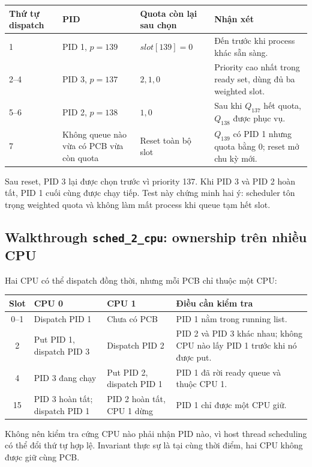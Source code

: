\documentclass[12pt,a4paper]{article}
\begin{document}
\begin{small}
\begin{longtable}{|p{2.3cm}|p{3cm}|p{3.3cm}|p{5.1cm}|}
\hline
\textbf{Thứ tự dispatch} & \textbf{PID} & \textbf{Quota còn lại sau chọn} &
\textbf{Nhận xét}\\ \hline
1 & PID 1, \(p=139\) & \(slot[139]=0\) & Đến trước khi process khác sẵn
sàng.\\ \hline
2--4 & PID 3, \(p=137\) & \(2,1,0\) & Priority cao nhất trong ready set,
dùng đủ ba weighted slot.\\ \hline
5--6 & PID 2, \(p=138\) & \(1,0\) & Sau khi \(Q_{137}\) hết quota,
\(Q_{138}\) được phục vụ.\\ \hline
7 & Không queue nào vừa có PCB vừa còn quota & Reset toàn bộ slot &
\(Q_{139}\) có PID 1 nhưng quota bằng 0; reset mở chu kỳ mới.\\ \hline
\end{longtable}
\end{small}

Sau reset, PID 3 lại được chọn trước vì priority 137. Khi PID 3 và PID 2 hoàn
tất, PID 1 cuối cùng được chạy tiếp. Test này chứng minh hai ý: scheduler tôn
trọng weighted quota và không làm mất process khi queue tạm hết slot.

\subsection{Walkthrough \texttt{sched\_2\_cpu}: ownership trên nhiều CPU}

Hai CPU có thể dispatch đồng thời, nhưng mỗi PCB chỉ thuộc một CPU:

\begin{longtable}{|c|p{4cm}|p{4cm}|p{5cm}|}
\hline
\textbf{Slot} & \textbf{CPU 0} & \textbf{CPU 1} & \textbf{Điều cần kiểm tra}\\
\hline
0--1 & Dispatch PID 1 & Chưa có PCB & PID 1 nằm trong running list.\\ \hline
2 & Put PID 1, dispatch PID 3 & Dispatch PID 2 & PID 2 và PID 3 khác nhau;
không CPU nào lấy PID 1 trước khi nó được put.\\ \hline
4 & PID 3 đang chạy & Put PID 2, dispatch PID 1 & PID 1 đã rời ready queue
và thuộc CPU 1.\\ \hline
15 & PID 3 hoàn tất; dispatch PID 1 & PID 2 hoàn tất, CPU 1 dừng &
PID 1 chỉ được một CPU giữ.\\ \hline
\end{longtable}

Không nên kiểm tra cứng CPU nào phải nhận PID nào, vì host thread scheduling
có thể đổi thứ tự hợp lệ. Invariant thực sự là tại cùng thời điểm, hai CPU
không được giữ cùng PCB.
\end{document}
